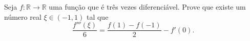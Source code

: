 Seja \(f \colon \mathbb{R} \to \mathbb{R}\) uma função que é três vezes diferenciável. Prove que existe um número real \(\xi \in (-1,1)\) tal que
\[ \frac{f'''(\xi)}{6} = \frac{f(1) - f(-1)}{2} - f'(0) . \]
